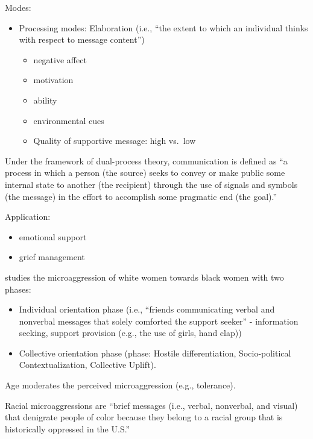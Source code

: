 \documentclass[
]{book}
\providecommand{\tightlist}{%
  \setlength{\itemsep}{0pt}\setlength{\parskip}{0pt}}
\begin{document}
Modes:

\begin{itemize}
\item
  Processing modes: Elaboration (i.e., ``the extent to which an individual thinks with respect to message content'')

  \begin{itemize}
  \item
    negative affect
  \item
    motivation
  \item
    ability
  \item
    environmental cues
  \item
    Quality of supportive message: high vs.~low
  \end{itemize}
\end{itemize}

Under the framework of dual-process theory, communication is defined as ``a process in which a person (the source) seeks
to convey or make public some internal state to another (the recipient) through the use of signals and symbols (the
message) in the effort to accomplish some pragmatic end (the goal).'' \citep{burleson_2010}

Application:

\begin{itemize}
\item
  emotional support
\item
  grief management
\end{itemize}

\citep{Davis_2018} studies the microaggression of white women towards black women with two phases:

\begin{itemize}
\tightlist
\item
  Individual orientation phase (i.e., ``friends communicating verbal and nonverbal messages that solely comforted the
  support seeker'' - information seeking, support provision (e.g., the use of girls, hand clap))
\item
  Collective orientation phase (phase: Hostile differentiation, Socio-political Contextualization, Collective Uplift).
\end{itemize}

Age moderates the perceived microaggression (e.g., tolerance).

Racial microaggressions are ``brief messages (i.e., verbal, nonverbal, and visual) that denigrate people of color because
they belong to a racial group that is historically oppressed in the U.S.'' \citep{Sue_2007}
\end{document}
